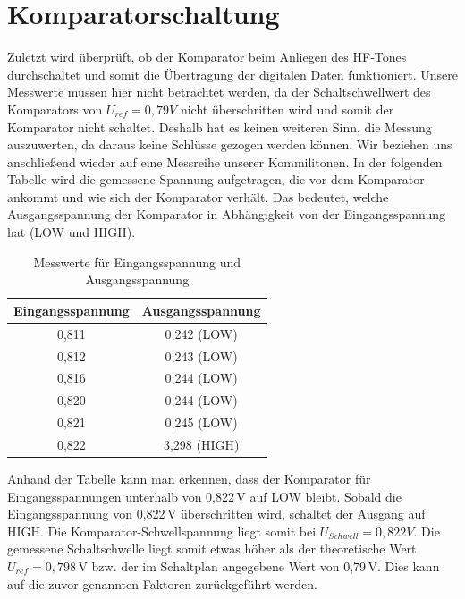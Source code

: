 \section{Komparatorschaltung} %
Zuletzt wird überprüft, ob der Komparator beim Anliegen des HF-Tones durchschaltet und somit die Übertragung der digitalen Daten funktioniert.
Unsere Messwerte müssen hier nicht betrachtet werden, da der Schaltschwellwert des Komparators von
$U_{ref}= 0,79V$ nicht überschritten wird und somit der Komparator nicht schaltet. Deshalb hat es keinen weiteren Sinn, die Messung auszuwerten, da daraus keine Schlüsse gezogen werden können.
Wir beziehen uns anschließend wieder auf eine Messreihe unserer Kommilitonen. In der folgenden Tabelle wird die gemessene Spannung
aufgetragen, die vor dem Komparator ankommt und wie sich der Komparator verhält. Das bedeutet, welche Ausgangsspannung
der Komparator in Abhängigkeit von der Eingangsspannung hat (LOW und HIGH).

\begin{table}[h]
\centering
\begin{tabular}{cc}
\textbf{Eingangsspannung} & \textbf{Ausgangsspannung} \\
\hline
0{,}811 & 0{,}242 (LOW) \\
0{,}812 & 0{,}243 (LOW) \\
0{,}816 & 0{,}244 (LOW) \\
0{,}820 & 0{,}244 (LOW) \\
0{,}821 & 0{,}245 (LOW) \\
0{,}822 & 3{,}298 (HIGH) \\
\end{tabular}
\caption{Messwerte für Eingangsspannung und Ausgangsspannung}
\end{table}

Anhand der Tabelle kann man erkennen, dass der Komparator für Eingangsspannungen unterhalb von 0{,}822\,V auf LOW bleibt. Sobald die Eingangsspannung von 0{,}822\,V überschritten wird, schaltet der Ausgang auf HIGH. Die Komparator-Schwellspannung liegt somit bei $U_{Schwell} = 0,822V$. Die gemessene Schaltschwelle liegt somit etwas höher als der theoretische Wert $U_{ref} = 0{,}798$\,V bzw. der im Schaltplan angegebene Wert von 0{,}79\,V. Dies kann auf die zuvor genannten Faktoren zurückgeführt werden.